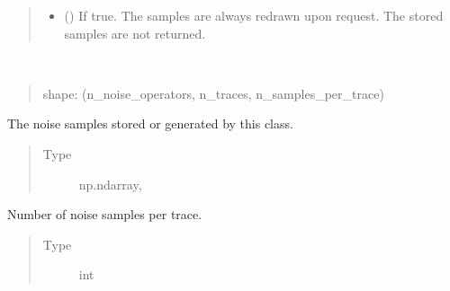 \documentclass[letterpaper,10pt,english]{sphinxmanual}
\begin{document}
\begin{fulllineitems}
\begin{quote}
\begin{description}
\begin{itemize}
\item {} 
 () \textendash{} If true. The samples are always redrawn upon request. The stored samples
are not returned.

\end{itemize}

\end{description}\end{quote}

\begin{fulllineitems}
\label{\detokenize{qsim:qsim.noise.NoiseTraceGenerator.noise_samples}}~\begin{quote}

shape: (n\_noise\_operators, n\_traces, n\_samples\_per\_trace)
\end{quote}

The noise samples stored or generated by this class.
\begin{quote}\begin{description}
\item[{Type}] \leavevmode
np.ndarray,

\end{description}\end{quote}

\end{fulllineitems}


\begin{fulllineitems}
\label{\detokenize{qsim:qsim.noise.NoiseTraceGenerator.n_samples_per_trace}}
Number of noise samples per trace.
\begin{quote}\begin{description}
\item[{Type}] \leavevmode
int

\end{description}\end{quote}

\end{fulllineitems}



\end{fulllineitems}
\end{document}

